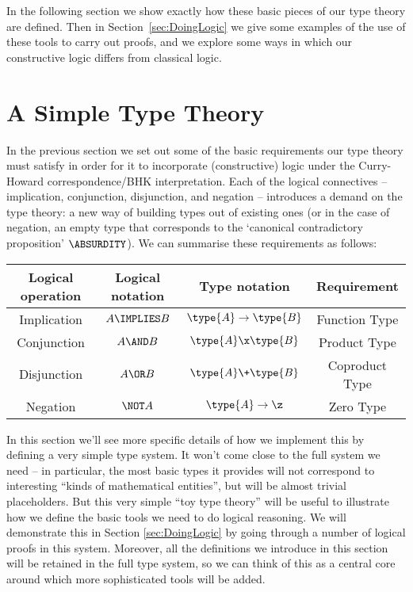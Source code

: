 In the following section we show exactly how these basic pieces of our type theory are defined. Then in Section~\ref{sec:DoingLogic} we give some examples of the use of these tools to carry out proofs, and we explore some ways in which our constructive logic differs from classical logic.


\newpage
\section{A Simple Type Theory}
\label{sec:SimpleTT}


In the previous section we set out some of the basic requirements our type theory must satisfy in order for it to incorporate (constructive) logic under the Curry-Howard correspondence/BHK interpretation. Each of the logical connectives -- implication, conjunction, disjunction, and negation -- introduces a demand on the type theory: a new way of building types out of existing ones (or in the case of negation, an empty type  that corresponds to the `canonical contradictory proposition' $\ABSURDITY$).  We can summarise these requirements as follows:

\begin{table}[h]
\centering
\begin{tabular}{|c|c|c|c|}
\hline
Logical operation	&	Logical notation	&	Type notation	&	Requirement\\
\hline
Implication	&	$A \IMPLIES B$	&		$\type{A} \to \type{B}$ 	&	Function Type\\
Conjunction	&	$A \AND B$		&		$\type{A} \x \type{B}$ 	&	Product Type\\
Disjunction	&	$A \OR B$		&		$\type{A} \+ \type{B}$ 	&	Coproduct Type\\
Negation	&	$\NOT A$		&		$\type{A} \to \z$ 		&	Zero Type\\
\hline
\end{tabular}
\end{table}

In this section we'll see more specific details of how we implement this by defining a very simple type system.  It won't come close to the full system we need -- in particular, the most basic types it provides will not correspond to interesting ``kinds of mathematical entities'', but will be almost trivial placeholders.  But this very simple ``toy type theory'' will be useful to illustrate how we define the basic tools we need to do logical reasoning.  We will demonstrate this in Section \ref{sec:DoingLogic} by going through a number of logical proofs in this system.  Moreover, all the definitions we introduce in this section will be retained in the full type system, so we can think of this as a central core around which more sophisticated tools will be added.

